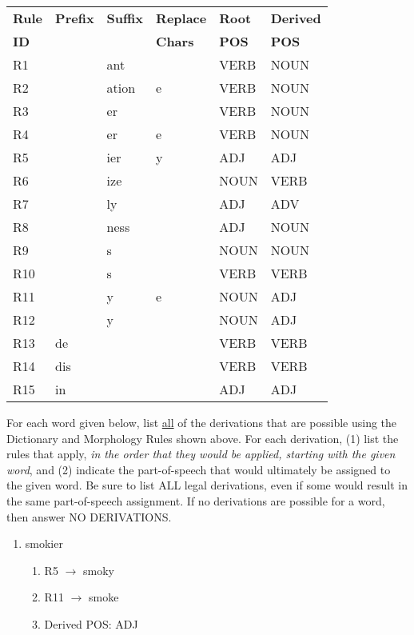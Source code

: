 \documentclass[11pt]{article}
\begin{document}
\begin{enumerate}
\begin{center}
 \small
 \begin{tabular}{|l|l|l|l|l||l|} \hline
\textbf{Rule} & \textbf{Prefix} & \textbf{Suffix} &   \textbf{Replace} &
\textbf{Root} & \textbf{Derived} \\   
\textbf{ID} & ~ & ~ & \textbf{Chars} & \textbf{POS} &  \textbf{POS} \\ \hline
R1 & ~  & ant & ~ & VERB & NOUN \\
R2 & ~  & ation & e & VERB & NOUN \\
R3 & ~  & er & ~ & VERB & NOUN \\
R4 & ~  & er & e & VERB & NOUN \\
R5 & ~  & ier & y & ADJ & ADJ \\
R6 & ~  & ize & ~ & NOUN & VERB \\
R7 & ~  & ly & ~ & ADJ & ADV \\
R8 & ~  & ness & ~ & ADJ & NOUN \\
R9   & ~ & s & ~ & NOUN & NOUN \\
R10   & ~ & s & ~ & VERB & VERB \\
R11 & ~  & y & e & NOUN & ADJ \\
R12 & ~  & y & ~ & NOUN & ADJ \\
R13 & de & ~ & ~ & VERB & VERB \\
R14 & dis & ~ & ~ & VERB & VERB \\
R15 & in  & ~ & ~ & ADJ & ADJ \\ \hline
\end{tabular}
\end{center}

For each word given below, list \underline{all} of the derivations that are
possible using the Dictionary and Morphology Rules shown above.  For
each derivation, (1) list the rules that apply, {\it in the order that
  they would be applied, starting with the given word}, and (2) indicate the part-of-speech that
would ultimately be assigned to the given word. Be sure to list ALL legal
derivations, even if some would result in the same part-of-speech
assignment. If no derivations are possible for a word, then answer
NO DERIVATIONS. 

\begin{enumerate}

\item smokier

    \begin{enumerate}
    
    \item R5 $\rightarrow$ smoky
    \item R11 $\rightarrow$ smoke
    \item Derived POS: ADJ
    

\end{enumerate}
\end{enumerate}
\end{enumerate}
\end{document}
